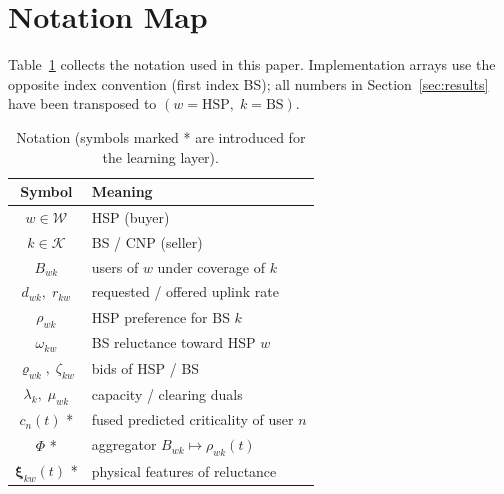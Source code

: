 \documentclass[journal,a4paper,10pt]{IEEEtran}
\begin{document}
\appendices
\section{Notation Map}
\label{app:notation}
Table~\ref{tab:not} collects the notation used in this paper. Implementation arrays use the opposite index convention (first index BS); all numbers in Section~\ref{sec:results} have been transposed to \((w=\mathrm{HSP},\;k=\mathrm{BS})\).

\begin{table}[!t]
\caption{Notation (symbols marked * are introduced for the learning layer).}
\label{tab:not}
\centering
\begin{tabular}{@{}cl@{}}
\toprule
Symbol & Meaning \\
\midrule
\(w\in\mathcal{W}\) & HSP (buyer) \\
\(k\in\mathcal{K}\) & BS / CNP (seller) \\
\(B_{wk}\) & users of \(w\) under coverage of \(k\) \\
\(d_{wk},\;r_{kw}\) & requested / offered uplink rate \\
\(\rho_{wk}\) & HSP preference for BS \(k\) \\
\(\omega_{kw}\) & BS reluctance toward HSP \(w\) \\
\(\varrho_{wk},\;\zeta_{kw}\) & bids of HSP / BS \\
\(\lambda_k,\;\mu_{wk}\) & capacity / clearing duals \\
\(c_n(t)\) * & fused predicted criticality of user \(n\) \\
\(\Phi\) * & aggregator \(B_{wk}\mapsto\rho_{wk}(t)\) \\
\(\boldsymbol{\xi}_{kw}(t)\) * & physical features of reluctance \\
\bottomrule
\end{tabular}
\end{table}



\end{document}
